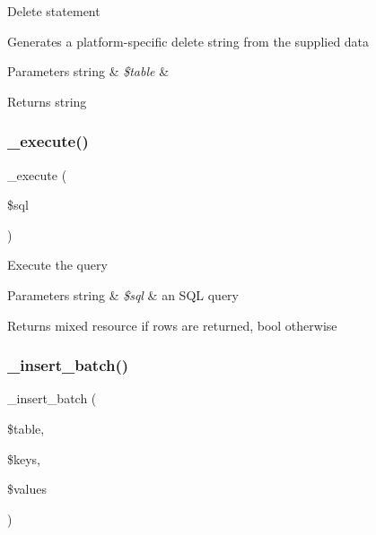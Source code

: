 Delete statement

Generates a platform-\/specific delete string from the supplied data


\begin{DoxyParams}[1]{Parameters}
string & {\em \$table} & \\
\hline
\end{DoxyParams}
\begin{DoxyReturn}{Returns}
string 
\end{DoxyReturn}
\mbox{\label{class_c_i___d_b__mssql__driver_a114ab675d89bf8324a41785fb475e86d}} 
\subsubsection{\texorpdfstring{\+\_\+execute()}{\_execute()}}
{\footnotesize\ttfamily \+\_\+execute (\begin{DoxyParamCaption}\item[{}]{\$sql }\end{DoxyParamCaption})\hspace{0.3cm}{\ttfamily [protected]}}

Execute the query


\begin{DoxyParams}[1]{Parameters}
string & {\em \$sql} & an S\+QL query \\
\hline
\end{DoxyParams}
\begin{DoxyReturn}{Returns}
mixed resource if rows are returned, bool otherwise 
\end{DoxyReturn}
\mbox{\label{class_c_i___d_b__mssql__driver_a1978e1358c812587a46e242630365099}} 
\subsubsection{\texorpdfstring{\+\_\+insert\+\_\+batch()}{\_insert\_batch()}}
{\footnotesize\ttfamily \+\_\+insert\+\_\+batch (\begin{DoxyParamCaption}\item[{}]{\$table,  }\item[{}]{\$keys,  }\item[{}]{\$values }\end{DoxyParamCaption})\hspace{0.3cm}{\ttfamily [protected]}}

